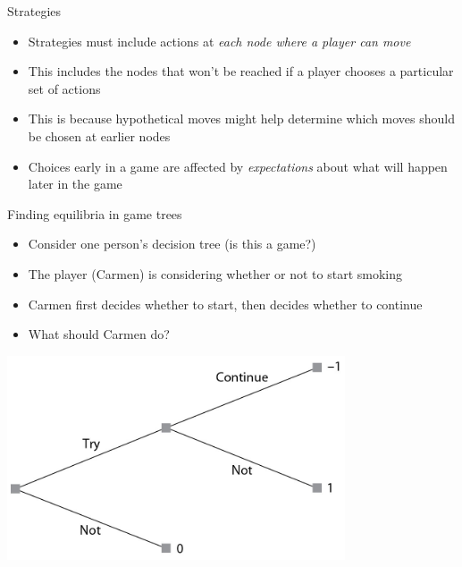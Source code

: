 \documentclass[10pt]{beamer}
\begin{document}
\begin{frame}[label={sec:orgf48d68d}]{}
\alert{Strategies}
\begin{itemize}
\item Strategies must include actions at \emph{each node where a player can move}
\item This includes the nodes that won't be reached if a player chooses a particular set of actions
\item This is because hypothetical moves might help determine which moves should be chosen at earlier nodes
\item Choices early in a game are affected by \emph{expectations} about what will happen later in the game
\end{itemize}
\end{frame}

\begin{frame}[label={sec:orge524e7b}]{}
\alert{Finding equilibria in game trees}
\begin{itemize}
\item Consider one person's decision tree (is this a game?)
\item The player (Carmen) is considering whether or not to start smoking
\item Carmen first decides whether to start, then decides whether to continue
\item What should Carmen do?
\end{itemize}
\end{frame}

\begin{frame}[label={sec:org10f6f58}]{}
\begin{center}
\includegraphics[width=0.75\textwidth]{./img/GAMES4_FIG03.02.jpg}
\end{center}
\end{frame}
\end{document}
